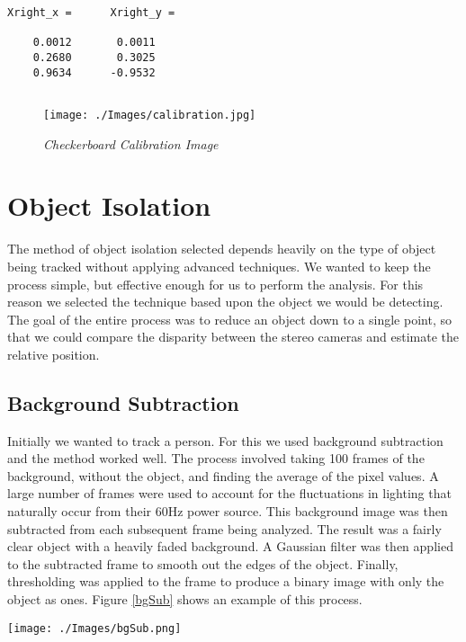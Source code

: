 \documentclass{IEEEtran}
\begin{document}
{ \small \begin{verbatim}
Xright_x =      Xright_y =

    0.0012       0.0011
    0.2680       0.3025
    0.9634      -0.9532
 
\end{verbatim} \color{black} }

 \begin{figure}[httb]
  \centering
  \texttt{[image: ./Images/calibration.jpg]}
  \caption{\emph{Checkerboard Calibration Image}}
  \label{checkerboard}
\end{figure}

\section{Object Isolation}
The method of object isolation selected depends heavily on the type of object being tracked without applying advanced techniques. We wanted to keep the process simple, but effective enough for us to perform the analysis. For this reason we selected the technique based upon the object we would be detecting. The goal of the entire process was to reduce an object down to a single point, so that we could compare the disparity between the stereo cameras and estimate the relative position.

\subsection{Background Subtraction}
Initially we wanted to track a person. For this we used background subtraction and the method worked well. The process involved taking 100 frames of the background, without the object, and finding the average of the pixel values. A large number of frames were used to account for the fluctuations in lighting that naturally occur from their 60Hz power source. This background image was then subtracted from each subsequent frame being analyzed. The result was a fairly clear object with a heavily faded background. A Gaussian filter was then applied to the subtracted frame to smooth out the edges of the object. Finally, thresholding was applied to the frame to produce a binary image with only the object as ones. Figure \ref{bgSub} shows an example of this process.
 
 \begin{figure*}[httb]
  \centering
  \texttt{[image: ./Images/bgSub.png]}
  \caption{\emph{Background Subtraction Process}}
  \label{bgSub} 
\end{figure*}
\end{document}
